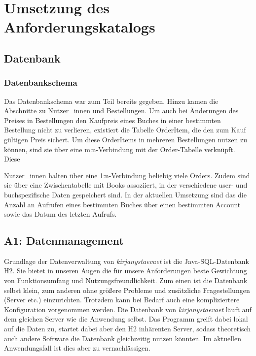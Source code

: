 \section{Umsetzung des Anforderungskatalogs}\label{sec:umsetzung}
	\subsection{Datenbank}\label{sec:umsetzung:DB:DBS}
		\subsubsection{Datenbankschema}\label{sec:umsetzung:DB:Schema}
		Das Datenbankschema war zum Teil bereits gegeben. Hinzu kamen die Abschnitte zu Nutzer\_innen und Bestellungen. Um auch bei Änderungen des Preises in Bestellungen den Kaufpreis eines Buches in einer bestimmten Bestellung nicht zu verlieren, existiert die Tabelle OrderItem, die den zum Kauf gültigen Preis sichert. Um diese OrderItems in mehreren Bestellungen nutzen zu können, sind sie über eine m:n-Verbindung mit der Order-Tabelle verknüpft. Diese 
		
		Nutzer\_innen halten über eine 1:n-Verbindung beliebig viele Orders. Zudem sind sie über eine Zwischentabelle mit Books assoziiert, in der verschiedene user- und buchspezifische Daten gespeichert sind. In der aktuellen Umsetzung sind das die Anzahl an Aufrufen eines bestimmten Buches über einen bestimmten Account sowie das Datum des letzten Aufrufs.
	
%	
	
	\subsection{A1: Datenmanagement}\label{sec:umsetzung:DB:DM}
	Grundlage der Datenverwaltung von \textit{kirjanystaevaet} ist die Java-SQL-Datenbank H2. Sie bietet in unseren Augen die für unsere Anforderungen beste Gewichtung von Funktionsumfang und Nutzungsfreundlichkeit. Zum einen ist die Datenbank selbst klein, zum anderen ohne größere Probleme und zusätzliche Fragestellungen (Server etc.) einzurichten. Trotzdem kann bei Bedarf auch eine kompliziertere Konfiguration vorgenommen werden. Die Datenbank von \textit{kirjanystaevaet} läuft auf dem gleichen Server wie die Anwendung selbst. Das Programm greift dabei lokal auf die Daten zu, startet dabei aber den H2 inhärenten Server, sodass theoretisch auch andere Software die Datenbank gleichzeitig nutzen könnten. Im aktuellen Anwendungsfall ist dies aber zu vernachlässigen.
	
